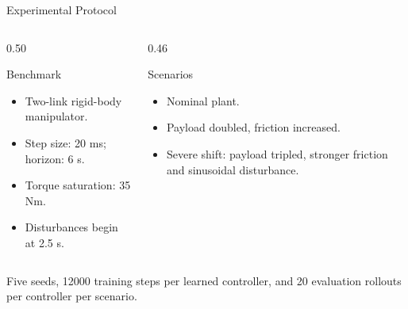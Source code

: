 \documentclass[aspectratio=169,10pt]{beamer}
\begin{document}
\begin{frame}{Experimental Protocol}
  \begin{columns}[T,onlytextwidth]
    \begin{column}{0.50\textwidth}
      \begin{block}{Benchmark}
        \begin{itemize}
          \item Two-link rigid-body manipulator.
          \item Step size: 20 ms; horizon: 6 s.
          \item Torque saturation: 35 Nm.
          \item Disturbances begin at 2.5 s.
        \end{itemize}
      \end{block}
    \end{column}
    \begin{column}{0.46\textwidth}
      \begin{block}{Scenarios}
        \begin{itemize}
          \item Nominal plant.
          \item Payload doubled, friction increased.
          \item Severe shift: payload tripled, stronger friction and sinusoidal disturbance.
        \end{itemize}
      \end{block}
    \end{column}
  \end{columns}
  \vfill
  Five seeds, 12000 training steps per learned controller, and 20 evaluation rollouts per controller per scenario.
\end{frame}
\end{document}
